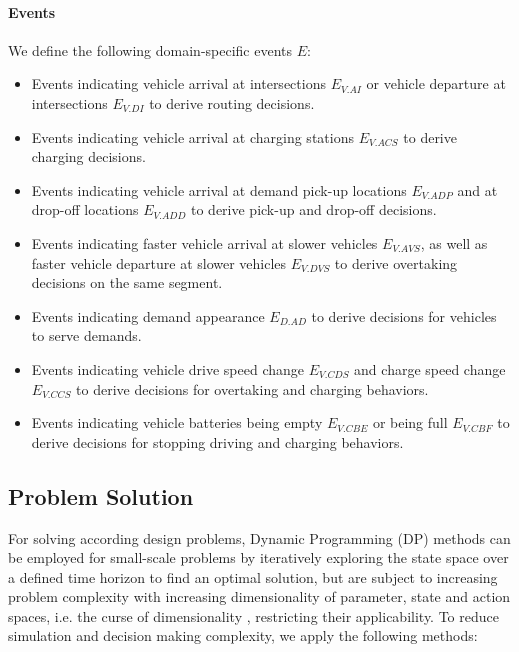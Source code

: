 \documentclass[a4paper,twoside]{article}
\begin{document}
	\paragraph{Events}
	We define the following domain-specific events $E$:
	\begin{itemize}
		\item Events indicating vehicle arrival at intersections $E_{V.AI}$ or vehicle departure at intersections $E_{V.DI}$ to derive routing decisions. 
		\item Events indicating vehicle arrival at charging stations $E_{V.ACS}$ to derive charging decisions. 
		\item Events indicating vehicle arrival at demand pick-up locations $E_{V.ADP}$ and at drop-off locations $E_{V.ADD}$ to derive pick-up and drop-off decisions. 
		\item Events indicating faster vehicle arrival at slower vehicles $E_{V.AVS}$, as well as faster vehicle departure at slower vehicles $E_{V.DVS}$ to derive overtaking decisions on the same segment.
		\item Events indicating demand appearance $E_{D.AD}$ to derive decisions for vehicles to serve demands.
		\item Events indicating vehicle drive speed change $E_{V.CDS}$ and charge speed change $E_{V.CCS}$ to derive decisions for overtaking and charging behaviors. 
		\item Events indicating vehicle batteries being empty $E_{V.CBE}$ or being full $E_{V.CBF}$ to derive decisions for stopping driving and charging behaviors.
	\end{itemize}

\subsection{Problem Solution}
\label{sec:problem-solution}

For solving according design problems, Dynamic Programming (DP) \cite{bellman_dynamic_1957} methods can be employed for small-scale problems by iteratively exploring the state space over a defined time horizon to find an optimal solution,
but are subject to increasing problem complexity with increasing dimensionality of parameter, state and action spaces, i.e. the curse of dimensionality \cite{bellman_dynamic_1957}, restricting their applicability.
To reduce simulation and decision making complexity, we apply the following methods:
\end{document}
